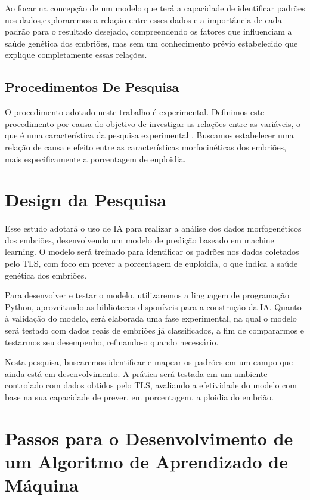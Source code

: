 Ao focar na concepção de um modelo que terá a capacidade de identificar padrões nos dados,exploraremos a relação entre esses dados e a importância de cada padrão para o resultado desejado, compreendendo os fatores que influenciam a saúde genética dos embriões, mas sem um conhecimento prévio estabelecido que explique completamente essas relações.

\subsection{Procedimentos De Pesquisa}

O procedimento adotado neste trabalho é experimental. Definimos este procedimento por causa do objetivo de investigar as relações entre as variáveis, o que é uma característica da pesquisa experimental \cite{nascimento2016}. Buscamos estabelecer uma relação de causa e efeito entre as características morfocinéticas dos embriões, mais especificamente a porcentagem de euploidia.

\section{Design da Pesquisa}

Esse estudo adotará o uso de IA para realizar a análise dos dados morfogenéticos dos embriões, desenvolvendo um modelo de predição baseado em machine learning. O modelo será treinado para identificar os padrões nos dados coletados pelo TLS, com foco em prever a porcentagem de euploidia, o que indica a saúde genética dos embriões.

Para desenvolver e testar o modelo, utilizaremos a linguagem de programação Python, aproveitando as bibliotecas disponíveis para a construção da IA. Quanto à validação do modelo, será elaborada uma fase experimental, na qual o modelo será testado com dados reais de embriões já classificados, a fim de compararmos e testarmos seu desempenho, refinando-o quando necessário.

Nesta pesquisa, buscaremos identificar e mapear os padrões em um campo que ainda está em desenvolvimento. A prática será testada em um ambiente controlado com dados obtidos pelo TLS, avaliando a efetividade do modelo com base na sua capacidade de prever, em porcentagem, a ploidia do embrião.

\section{Passos para o Desenvolvimento de um Algoritmo de Aprendizado de Máquina}

